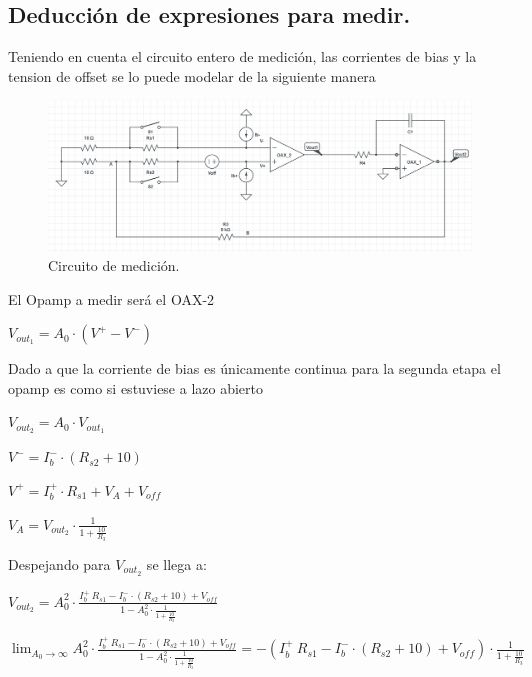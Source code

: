 \subsection{Deducción de expresiones para medir.}

Teniendo en cuenta el circuito entero de medición, las corrientes de bias y la tension de offset se lo puede modelar de la siguiente manera
\begin{figure}[H]	
	\centering
	\includegraphics[width=\textwidth]{Ej3/imagenes/Medicion.PNG}
	\caption{Circuito de medición.}
	\label{fig:Medicion}
\end{figure}
El Opamp a medir será el OAX-2
\begin{center}$V_{out_1}=A_0 \cdot (V^+ - V^-)$\\\end{center}
Dado a que la corriente de bias es únicamente continua para la segunda etapa el opamp es como si estuviese a lazo abierto\\
\begin{center}$V_{out_2}=A_0 \cdot V_{out_1}$\\\end{center}
\begin{center}$V^-=I_b^- \cdot (R_{s2}+10)$\\\end{center}
\begin{center}$V^+=I_b^+ \cdot R_{s1} +V_A+V_{off}$\\\end{center}
\begin{center}$V_A=V_{out_2} \cdot \frac{1}{1+\frac{10}{R_3}}$\\\end{center}
Despejando para $V_{out_2}$ se llega a:
\begin{center}$V_{out_2}=A_0^2  \cdot \frac{I_b^+ \ R_{s1} -I_b^-\cdot (R_{s2}+10)+V_{off}}{1-A_0^2 \cdot \frac{1}{1+\frac{10}{R_3}}}$\\\end{center}
$\lim_{A_0\to\infty} A_0^2  \cdot \frac{I_b^+ \ R_{s1} -I_b^-\cdot (R_{s2}+10)+V_{off}}{1-A_0^2 \cdot \frac{1}{1+\frac{10}{R_3}}}=-(I_b^+ \ R_{s1} -I_b^-\cdot (R_{s2}+10)+V_{off})\cdot \frac{1}{1+\frac{10}{R_3}} $

